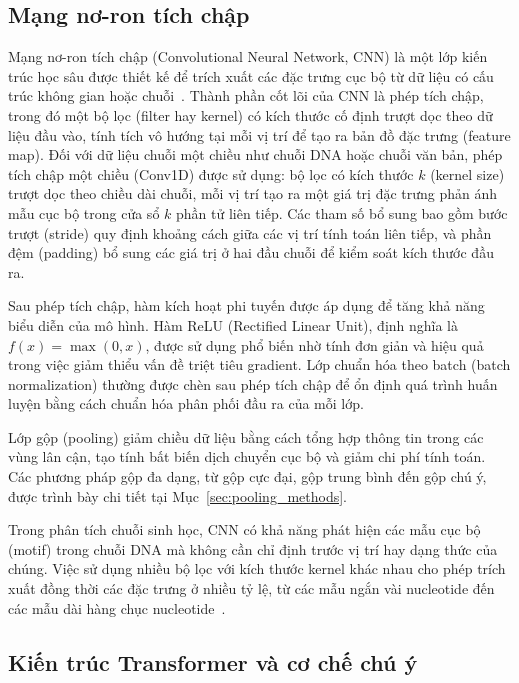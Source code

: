 \subsection{Mạng nơ-ron tích chập}
\label{subsec:cnn}

Mạng nơ-ron tích chập (Convolutional Neural Network, CNN) là một lớp kiến trúc học sâu được thiết kế để trích xuất các đặc trưng cục bộ từ dữ liệu có cấu trúc không gian hoặc chuỗi~\cite{kim2014convolutional}. Thành phần cốt lõi của CNN là phép tích chập, trong đó một bộ lọc (filter hay kernel) có kích thước cố định trượt dọc theo dữ liệu đầu vào, tính tích vô hướng tại mỗi vị trí để tạo ra bản đồ đặc trưng (feature map). Đối với dữ liệu chuỗi một chiều như chuỗi DNA hoặc chuỗi văn bản, phép tích chập một chiều (Conv1D) được sử dụng: bộ lọc có kích thước $k$ (kernel size) trượt dọc theo chiều dài chuỗi, mỗi vị trí tạo ra một giá trị đặc trưng phản ánh mẫu cục bộ trong cửa sổ $k$ phần tử liên tiếp. Các tham số bổ sung bao gồm bước trượt (stride) quy định khoảng cách giữa các vị trí tính toán liên tiếp, và phần đệm (padding) bổ sung các giá trị ở hai đầu chuỗi để kiểm soát kích thước đầu ra.

Sau phép tích chập, hàm kích hoạt phi tuyến được áp dụng để tăng khả năng biểu diễn của mô hình. Hàm ReLU (Rectified Linear Unit), định nghĩa là $f(x) = \max(0, x)$, được sử dụng phổ biến nhờ tính đơn giản và hiệu quả trong việc giảm thiểu vấn đề triệt tiêu gradient. Lớp chuẩn hóa theo batch (batch normalization) thường được chèn sau phép tích chập để ổn định quá trình huấn luyện bằng cách chuẩn hóa phân phối đầu ra của mỗi lớp.

Lớp gộp (pooling) giảm chiều dữ liệu bằng cách tổng hợp thông tin trong các vùng lân cận, tạo tính bất biến dịch chuyển cục bộ và giảm chi phí tính toán. Các phương pháp gộp đa dạng, từ gộp cực đại, gộp trung bình đến gộp chú ý, được trình bày chi tiết tại Mục~\ref{sec:pooling_methods}.

Trong phân tích chuỗi sinh học, CNN có khả năng phát hiện các mẫu cục bộ (motif) trong chuỗi DNA mà không cần chỉ định trước vị trí hay dạng thức của chúng. Việc sử dụng nhiều bộ lọc với kích thước kernel khác nhau cho phép trích xuất đồng thời các đặc trưng ở nhiều tỷ lệ, từ các mẫu ngắn vài nucleotide đến các mẫu dài hàng chục nucleotide~\cite{kim2014convolutional}.

\subsection{Kiến trúc Transformer và cơ chế chú ý}
\label{subsec:transformer}

